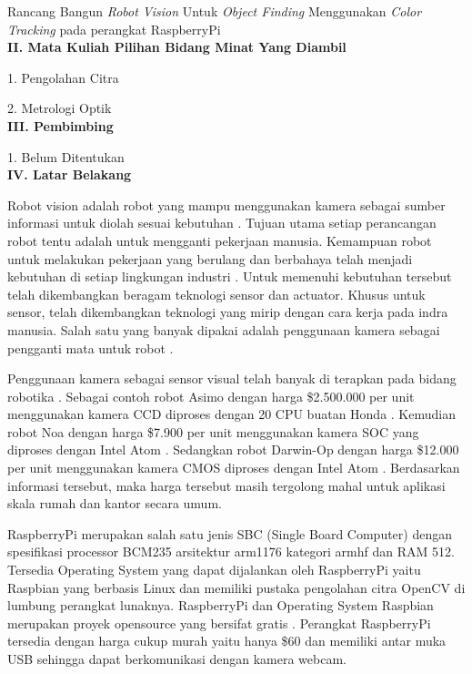 \documentclass[a4paper,12pt]{article}
\begin{document}
Rancang Bangun \textit{Robot Vision} Untuk \textit{Object Finding} Menggunakan \textit{Color Tracking} pada perangkat RaspberryPi
\\[10pt]
\noindent \textbf{II. \hspace{9pt} Mata Kuliah Pilihan Bidang Minat Yang Diambil}

1. Pengolahan Citra

2. Metrologi Optik
\\[10pt]
\noindent \textbf{III. \hspace{8pt} Pembimbing}

1. Belum Ditentukan
\\[10pt]
\noindent \textbf{IV. \hspace{9pt} Latar Belakang} 

Robot vision adalah robot yang mampu menggunakan kamera sebagai sumber informasi untuk diolah sesuai kebutuhan \cite{robot}.
Tujuan utama setiap perancangan robot tentu adalah untuk mengganti pekerjaan manusia.
Kemampuan robot untuk melakukan pekerjaan yang berulang dan berbahaya telah menjadi kebutuhan di setiap lingkungan industri \cite{robot_function} . 
Untuk memenuhi kebutuhan tersebut telah dikembangkan beragam teknologi sensor dan actuator.
Khusus untuk sensor, telah dikembangkan teknologi yang mirip dengan cara kerja pada indra manusia.
Salah satu yang banyak dipakai adalah penggunaan kamera sebagai pengganti mata untuk robot \cite{robot}.

Penggunaan kamera sebagai sensor visual telah banyak di terapkan pada bidang robotika \cite{robot}.
Sebagai contoh robot Asimo dengan harga \$2.500.000 per unit menggunakan kamera CCD diproses dengan 20 CPU buatan Honda \cite{asimo}.
Kemudian robot Noa dengan harga \$7.900 per unit menggunakan kamera SOC yang diproses dengan Intel Atom \cite{nao}.
Sedangkan robot Darwin-Op dengan harga \$12.000 per unit menggunakan kamera CMOS diproses dengan Intel Atom \cite{darwinop}.
Berdasarkan informasi tersebut, maka harga tersebut masih tergolong mahal untuk aplikasi skala rumah dan kantor secara umum.

RaspberryPi merupakan salah satu jenis SBC (Single Board Computer) dengan spesifikasi processor BCM235 arsitektur arm1176 kategori armhf dan RAM 512.
Tersedia Operating System yang dapat dijalankan oleh RaspberryPi yaitu Raspbian yang berbasis Linux dan memiliki pustaka pengolahan citra OpenCV di lumbung perangkat lunaknya.
RaspberryPi dan Operating System Raspbian merupakan proyek opensource yang bersifat gratis \cite{raspi}.
Perangkat RaspberryPi tersedia dengan harga cukup murah yaitu hanya \$60 dan memiliki antar muka USB sehingga dapat berkomunikasi dengan kamera webcam.
\end{document}

